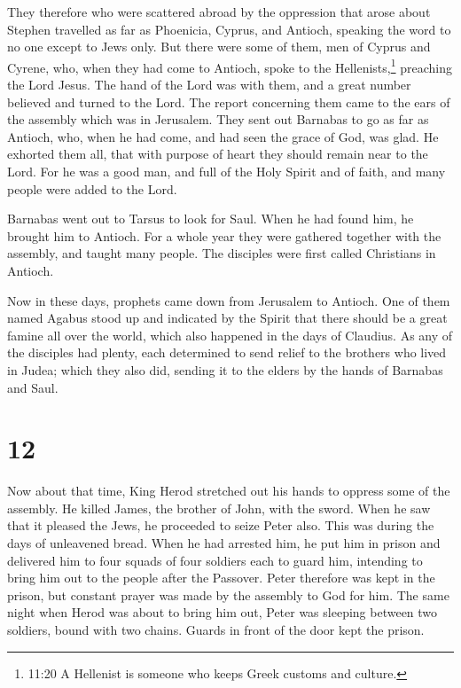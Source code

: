  They therefore who were scattered abroad by the oppression
that arose about Stephen travelled as far as Phoenicia, Cyprus, and
Antioch, speaking the word to no one except to Jews only. 
But there were some of them, men of Cyprus and Cyrene, who, when they
had come to Antioch, spoke to the Hellenists,\footnote{11:20 A Hellenist
  is someone who keeps Greek customs and culture.} preaching the Lord
Jesus.  The hand of the Lord was with them, and a great
number believed and turned to the Lord.  The report
concerning them came to the ears of the assembly which was in Jerusalem.
They sent out Barnabas to go as far as Antioch,  who, when
he had come, and had seen the grace of God, was glad. He exhorted them
all, that with purpose of heart they should remain near to the Lord.
 For he was a good man, and full of the Holy Spirit and of
faith, and many people were added to the Lord.

 Barnabas went out to Tarsus to look for Saul.
 When he had found him, he brought him to Antioch. For a
whole year they were gathered together with the assembly, and taught
many people. The disciples were first called Christians in Antioch.

 Now in these days, prophets came down from Jerusalem to
Antioch.  One of them named Agabus stood up and indicated
by the Spirit that there should be a great famine all over the world,
which also happened in the days of Claudius.  As any of the
disciples had plenty, each determined to send relief to the brothers who
lived in Judea;  which they also did, sending it to the
elders by the hands of Barnabas and Saul.

\hypertarget{section-11}{%
\section{12}\label{section-11}}

 Now about that time, King Herod stretched out his hands to
oppress some of the assembly.  He killed James, the brother
of John, with the sword.  When he saw that it pleased the
Jews, he proceeded to seize Peter also. This was during the days of
unleavened bread.  When he had arrested him, he put him in
prison and delivered him to four squads of four soldiers each to guard
him, intending to bring him out to the people after the Passover.
 Peter therefore was kept in the prison, but constant prayer
was made by the assembly to God for him.  The same night
when Herod was about to bring him out, Peter was sleeping between two
soldiers, bound with two chains. Guards in front of the door kept the
prison.

